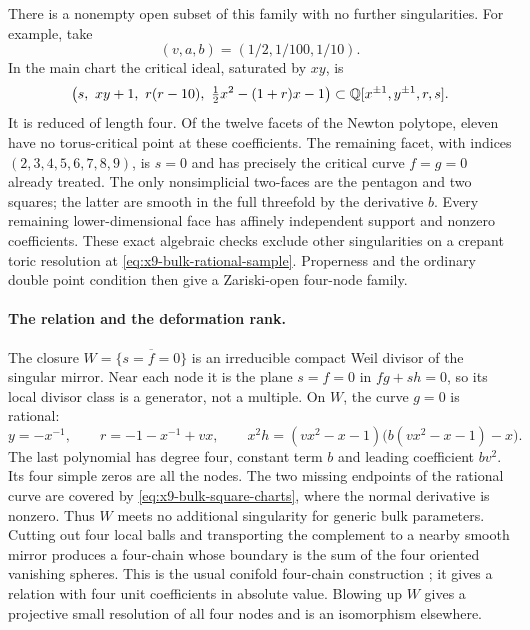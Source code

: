 There is a nonempty open subset of this family with no further
singularities. For example, take
\begin{equation}
 (v,a,b)=(1/2,1/100,1/10).
 \label{eq:x9-bulk-rational-sample}
\end{equation}
In the main chart the critical ideal, saturated by $xy$, is
\begin{equation}
 \bigl(s,\ xy+1,\ r(r-10),\ \tfrac12x^2-(1+r)x-1\bigr)
       \subset\QQ[x^{\pm1},y^{\pm1},r,s].
 \label{eq:x9-bulk-critical-ideal}
\end{equation}
It is reduced of length four. Of the twelve facets of the Newton
polytope, eleven have no torus-critical point at these coefficients.
The remaining facet, with indices $(2,3,4,5,6,7,8,9)$, is $s=0$
and has precisely the critical curve $f=g=0$ already treated.
The only nonsimplicial two-faces are the pentagon and two squares;
the latter are smooth in the full threefold by the derivative $b$.
Every remaining lower-dimensional face has affinely independent
support and nonzero coefficients. These exact algebraic checks
exclude other singularities on a crepant toric resolution at
\eqref{eq:x9-bulk-rational-sample}. Properness and the ordinary
double point condition then give a Zariski-open four-node family.

\paragraph{The relation and the deformation rank.}
The closure $W=\overline{\{s=f=0\}}$ is an irreducible compact
Weil divisor of the singular mirror. Near each node it is the
plane $s=f=0$ in $fg+sh=0$, so its local divisor class is a
generator, not a multiple. On $W$, the curve $g=0$ is rational:
\begin{equation}
 y=-x^{-1},\qquad r=-1-x^{-1}+vx,\qquad
 x^2h=(vx^2-x-1)\bigl(b(vx^2-x-1)-x\bigr).
 \label{eq:x9-bulk-four-intersections}
\end{equation}
The last polynomial has degree four, constant term $b$ and
leading coefficient $bv^2$. Its four simple zeros are all the
nodes. The two missing endpoints of the rational curve are
covered by \eqref{eq:x9-bulk-square-charts}, where the normal
derivative is nonzero. Thus $W$ meets no additional singularity
for generic bulk parameters. Cutting out four local balls and
transporting the complement to a nearby smooth mirror produces
a four-chain whose boundary is the sum of the four oriented
vanishing spheres. This is the usual conifold four-chain
construction \cite[Section~3]{Greene:1995hu}; it gives
a relation with four unit coefficients in absolute value.
Blowing up $W$ gives a projective small resolution of all four
nodes and is an isomorphism elsewhere.

